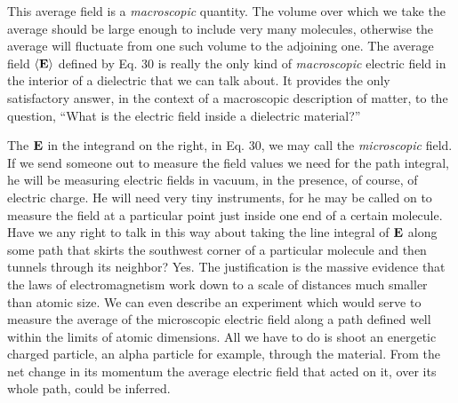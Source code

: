 This average field is a \emph{macroscopic} quantity. The volume over
which we take the average should be large enough to include very
many molecules, otherwise the average will fluctuate from one such
volume to the adjoining one. The average field $\langle\mathbf{E}\rangle$ defined by Eq. 30
is really the only kind of \emph{macroscopic} electric field in the interior of
a dielectric that we can talk about. It provides the only satisfactory
answer, in the context of a macroscopic description of matter, to the
question, ``What is the electric field inside a dielectric material?''

The $\mathbf{E}$ in the integrand on the right, in Eq. 30, we may call the
\emph{microscopic} field. If we send someone out to measure the field values
we need for the path integral, he will be measuring electric fields in
vacuum, in the presence, of course, of electric charge. He will need
very tiny instruments, for he may be called on to measure the field
at a particular point just inside one end of a certain molecule. Have
we any right to talk in this way about taking the line integral of $\mathbf{E}$
along some path that skirts the southwest corner of a particular
molecule and then tunnels through its neighbor? Yes. The justification
is the massive evidence that the laws of electromagnetism work
down to a scale of distances much smaller than atomic size. We can
even describe an experiment which would serve to measure the
average of the microscopic electric field along a path defined well
within the limits of atomic dimensions. All we have to do is shoot
an energetic charged particle, an alpha particle for example, through
the material. From the net change in its momentum the average
electric field that acted on it, over its whole path, could be inferred.


